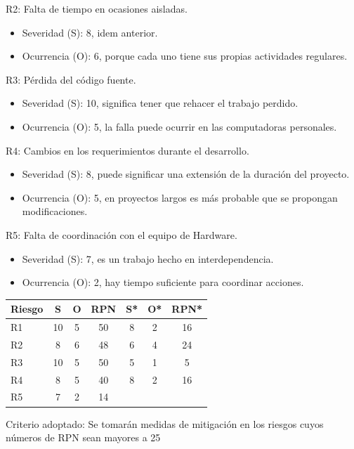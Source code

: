 \documentclass[11pt]{charter}
\begin{document}
R2: Falta de tiempo en ocasiones aisladas.
\begin{itemize}
\item Severidad (S): 8, idem anterior.
\item Ocurrencia (O): 6, porque cada uno tiene sus propias actividades regulares.
\end{itemize}

R3: Pérdida del código fuente.
\begin{itemize}
\item Severidad (S): 10, significa tener que rehacer el trabajo perdido. 
\item Ocurrencia (O): 5, la falla puede ocurrir en las computadoras personales.
\end{itemize}

R4: Cambios en los requerimientos durante el desarrollo.
\begin{itemize}
\item Severidad (S): 8, puede significar una extensión de la duración del proyecto.
\item Ocurrencia (O): 5, en proyectos largos es más probable que se propongan modificaciones.
\end{itemize}

R5: Falta de coordinación con el equipo de Hardware.
\begin{itemize}
\item Severidad (S): 7, es un trabajo hecho en interdependencia.
\item Ocurrencia (O): 2, hay tiempo suficiente para coordinar acciones.
\end{itemize}


\begin{table}[htpb]
\centering
\begin{tabularx}{\linewidth}{@{}|X|c|c|c|c|c|c|@{}}
\hline
\rowcolor[HTML]{C0C0C0} 
Riesgo & S & O & RPN & S* & O* & RPN* \\ \hline
R1 & 10 & 5 & 50 & 8 & 2 & 16    \\ \hline
R2 & 8 & 6 & 48 & 6 & 4 & 24   \\ \hline
R3 & 10 & 5 & 50 & 5 & 1 & 5   \\ \hline
R4 & 8 & 5 & 40 & 8 & 2 & 16   \\ \hline
R5 & 7 & 2 & 14 &  &  &    \\ \hline
\end{tabularx}%
\end{table}

Criterio adoptado: 
Se tomarán medidas de mitigación en los riesgos cuyos números de RPN sean mayores a 25
\end{document}
